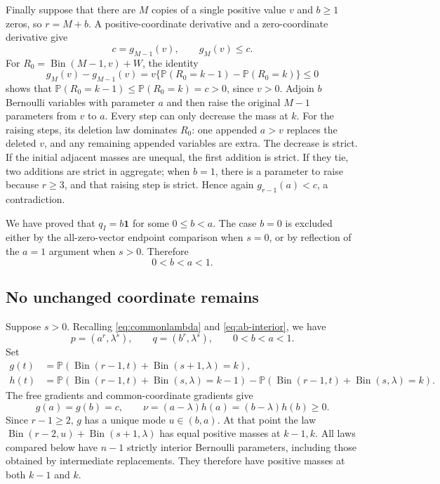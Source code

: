 \documentclass[11pt]{article}
\numberwithin{equation}{section}
\theoremstyle{remark}\newtheorem{remark}[theorem]{Remark}
\DeclareMathOperator{\Bin}{Bin}
\newcommand{\PP}{\mathbb P}
\newcommand{\one}{\mathbf 1}
\begin{document}
Finally suppose that there are $M$ copies of a single positive value
$v$ and $b\ge1$ zeros, so $r=M+b$. A positive-coordinate derivative
and a zero-coordinate derivative give
\[
 c=g_{M-1}(v),\qquad g_M(v)\le c.
\]
For $R_0=\Bin(M-1,v)+W$, the identity
\[
 g_M(v)-g_{M-1}(v)
 =v\{\PP(R_0=k-1)-\PP(R_0=k)\}\le0
\]
shows that $\PP(R_0=k-1)\le\PP(R_0=k)=c>0$, since $v>0$.
Adjoin $b$ Bernoulli variables with
parameter $a$ and then raise the original $M-1$ parameters from $v$
to $a$. Every step can only decrease the mass at $k$. For the raising
steps, its deletion law dominates $R_0$: one appended $a>v$ replaces
the deleted $v$, and any remaining appended variables are extra.
The decrease is strict. If the initial adjacent masses are unequal,
the first addition is strict. If they tie, two additions are strict
in aggregate; when $b=1$, there is a parameter to raise because
$r\ge3$, and that raising step is strict. Hence again
$g_{r-1}(a)<c$, a contradiction.

We have proved that $q_I=b\one$ for some $0\le b<a$. The case $b=0$
is excluded either by the all-zero-vector endpoint comparison when
$s=0$, or by reflection of the $a=1$ argument when $s>0$. Therefore
\begin{equation}\label{eq:ab-interior}
 0<b<a<1.
\end{equation}

\subsection{No unchanged coordinate remains}
Suppose $s>0$. Recalling \eqref{eq:commonlambda} and
\eqref{eq:ab-interior}, we have
\[
 p=(a^r,\lambda^s),\qquad q=(b^r,\lambda^s),\qquad 0<b<a<1.
\]
Set
\begin{align*}
 g(t)&=\PP(\Bin(r-1,t)+\Bin(s+1,\lambda)=k),\\
 h(t)&=\PP(\Bin(r-1,t)+\Bin(s,\lambda)=k-1)
       -\PP(\Bin(r-1,t)+\Bin(s,\lambda)=k).
\end{align*}
The free gradients and common-coordinate gradients give
\begin{equation}\label{eq:nu}
 g(a)=g(b)=c,\qquad
 \nu=(a-\lambda)h(a)=(b-\lambda)h(b)\ge0.
\end{equation}
Since $r-1\ge2$, $g$ has a unique mode $u\in(b,a)$.
At that point the law
$\Bin(r-2,u)+\Bin(s+1,\lambda)$ has equal positive masses at $k-1,k$.
All laws compared below have $n-1$ strictly interior Bernoulli
parameters, including those obtained by intermediate replacements.
They therefore have positive masses at both $k-1$ and $k$.
\end{document}
